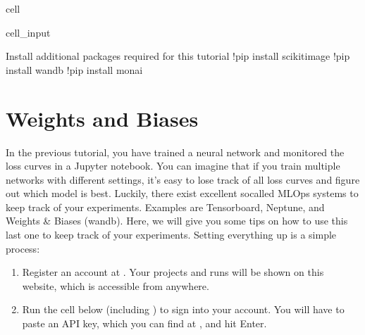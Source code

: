 \documentclass[letterpaper,10pt,english]{jupyterBook}
\begin{document}
\begin{sphinxuseclass}{cell}\begin{sphinxVerbatimInput}

\begin{sphinxuseclass}{cell_input}
\begin{sphinxVerbatim}[commandchars=\\\{\}]
\PYGZsh{} Install additional packages required for this tutorial
!pip install scikit\PYGZhy{}image
!pip install wandb
!pip install monai
\end{sphinxVerbatim}

\end{sphinxuseclass}\end{sphinxVerbatimInput}

\end{sphinxuseclass}
\sphinxAtStartPar



\chapter{Weights and Biases}
\label{\detokenize{notebooks/Tutorial3_Segmentation/Tutorial3_Segmentation_student:weights-and-biases}}
\sphinxAtStartPar
In the previous tutorial, you have trained a neural network and monitored the loss curves in a Jupyter notebook. You can imagine that if you train multiple networks with different settings, it’s easy to lose track of all loss curves and figure out which model is best. Luckily, there exist excellent so\sphinxhyphen{}called MLOps systems to keep track of your experiments. Examples are Tensorboard, Neptune, and Weights \& Biases (wandb). Here, we will give you some tips on how to use this last one to keep track of your experiments. Setting everything up is a simple process:
\begin{enumerate}
%
\item {} 
\sphinxAtStartPar
Register an account at . Your projects and runs will be shown on this website, which is accessible from anywhere.

\item {} 
\sphinxAtStartPar
Run the cell below (including ) to sign into your account. You will have to paste an API key, which you can find at , and hit Enter.

\end{enumerate}
\end{document}
